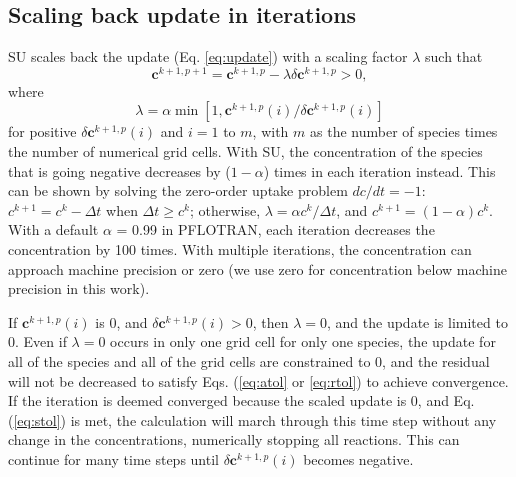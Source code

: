 \documentclass[gmd, manuscript]{copernicus}
\begin{document}
\subsection{Scaling back update in iterations}
\label{subsection:su}
SU scales back the update (Eq. \ref{eq:update}) with a scaling factor
$\lambda$ \citep{Bethke2007,Hammond2003} such that 
\begin{equation}
\mathbf{c}^{k+1,p+1}=\mathbf{c}^{k+1,p}-\lambda \delta \mathbf{c}^{k+1,p} > 0,
\label{eq:lambda}
\end{equation}
where
\begin{equation}
\lambda = \alpha \min\left[1, {\mathbf{c}^{k+1,p}(i)}/{\delta \mathbf{c}^{k+1,p} (i)}\right]
\label{eq:alpha}
\end{equation}
for positive $\delta \mathbf{c}^{k+1,p} (i)$ and $i=1$ to $m$, with $m$ as the
number of species times the number of numerical grid cells. With SU, the
concentration of the species that is going negative decreases by ($1-\alpha$)
times in each iteration instead. This can be shown by solving the zero-order
uptake problem $dc/dt=-1$: $c^{k+1}=c^k-\Delta t$ when $\Delta t \geq c^k$;
otherwise, $\lambda=\alpha c^k/\Delta t$, and $c^{k+1}=(1-\alpha)c^k$. With a
default $\alpha$ = 0.99 in PFLOTRAN, each iteration decreases the concentration
by 100 times. With multiple iterations, the concentration can approach machine
precision or zero (we use zero for concentration below machine precision in this work).

If $\mathbf{c}^{k+1,p}(i)$ is 0,
and $\delta \mathbf{c}^{k+1,p} (i) > 0$, then $\lambda = 0$, and the
update is limited to 0. Even if $\lambda = 0$ occurs in only one grid cell for only one
species, the update for all of the species and all of the grid cells are
constrained to 0, and the residual will not be decreased to
satisfy Eqs.
(\ref{eq:atol} or \ref{eq:rtol}) to achieve convergence.  If the iteration is
deemed converged because the scaled update is 0, and Eq. (\ref{eq:stol}) is
met, the calculation will march through this time step without any change in
the concentrations, numerically stopping all reactions. This can continue for
many time steps until $\delta \mathbf{c}^{k+1,p} (i)$ becomes negative.
 
\end{document}
